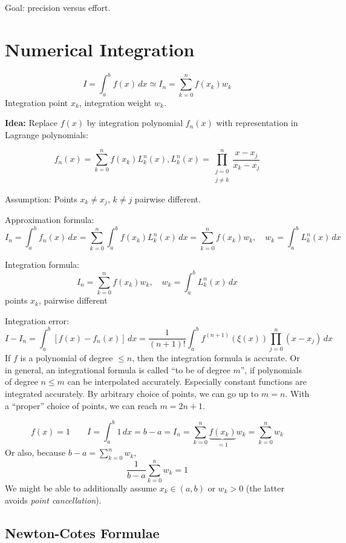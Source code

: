 \documentclass{article}
\begin{document}
Goal: precision versus effort.




\section{Numerical Integration}

\[ I = \int_a^b f(x) \, dx \simeq I_n = \sum_{k=0}^n f(x_k) w_k \]
Integration point $x_k$, integration weight $w_k$.

\textbf{Idea:} Replace $f(x)$ by integration polynomial $f_n(x)$ with representation in Lagrange polynomials:

\[ f_n(x) = \sum_{k=0}^n f(x_k) L_k^n(x), L_k^n(x) = \prod_{\substack{j=0 \\ j \neq k}}^n \frac{x - x_j}{x_k - x_j} \]

Assumption: Points $x_k \neq x_j$, $k \neq j$ pairwise different.

Approximation formula:
\[ I_n = \int_a^b f_n(x) \, dx = \sum_{k=0}^n \int_a^b f(x_k) L_k^n(x) \, dx = \sum_{k=0}^n f(x_k) w_k, \quad w_k = \int_a^b L_k^n(x) \, dx \]

Integration formula:
\[ I_n = \sum_{k=0}^n f(x_k) w_k, \quad w_k = \int_a^b L_k^n(x) \, dx \]
points $x_k$, pairwise different

Integration error:
\[ I - I_n = \int_a^b \left[f(x) - f_n(x)\right] \, dx = \frac{1}{(n+1)!} \int_a^b f^{(n+1)}(\xi(x)) \prod_{j=0}^n (x - x_j) \, dx \]
If $f$ is a polynomial of degree $\leq n$, then the integration formula is accurate.
Or in general, an integrational formula is called \enquote{to be of degree $m$}, if polynomials of degree $n \leq m$ can be interpolated accurately.
Especially constant functions are integrated accurately.
By arbitrary choice of points, we can go up to $m=n$. With a \enquote{proper} choice of points, we can reach $m = 2n + 1$.

\[ f(x) = 1 \qquad I = \int_a^b 1 \, dx = b - a = I_n = \sum_{k=0}^n \underbrace{f(x_k)}_{=1} w_k = \sum_{k=0}^n w_k \]
Or also, because $b - a = \sum_{k=0}^n w_k$,
\[ \frac1{b-a} \sum_{k=0}^n w_k = 1 \]
We might be able to additionally assume $x_k \in (a,b)$ or $w_k > 0$ (the latter avoids \emph{point cancellation}).

\subsection{Newton-Cotes Formulae}
\end{document}
